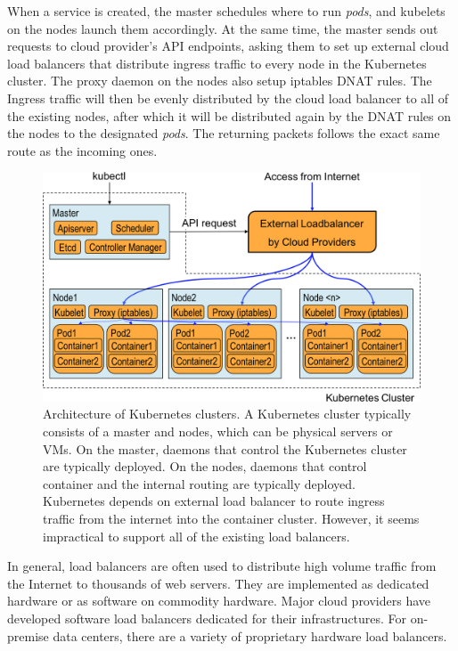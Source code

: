 When a service is created, the master schedules where to run {\em pods}, and kubelets on the nodes launch them accordingly.
At the same time, the master sends out requests to cloud provider's API endpoints, asking them to set up external cloud load balancers that distribute ingress traffic to every node in the Kubernetes cluster.
The proxy daemon on the nodes also setup iptables DNAT \cite{MartinA.Brown2017} rules. 
The Ingress traffic will then be evenly distributed by the cloud load balancer to all of the existing nodes, 
after which it will be distributed again by the DNAT rules on the nodes to the designated {\em pods}. 
The returning packets follows the exact same route as the incoming ones.

\begin{figure}[h]
  \centering
  \includegraphics[width=0.8\columnwidth]{Figs/K8sConventional}
  
  \centering
  
  \begin{minipage}{0.9\columnwidth}
    \caption[Architecture of Kubernetes clusters]{
      Architecture of Kubernetes clusters.
      A Kubernetes cluster typically consists of a master and nodes, which can be physical servers or VMs.
      On the master, daemons that control the Kubernetes cluster are typically deployed. 
      On the nodes,  daemons that control container and the internal routing are typically deployed.
      Kubernetes depends on external load balancer to route ingress traffic from the internet into the container cluster.
      However, it seems impractical to support all of the existing load balancers.
    }
    \label{fig:k8s_intro}
  \end{minipage}
  
\end{figure}

In general, load balancers are often used to distribute high volume traffic from the Internet to thousands of web servers.
They are implemented as dedicated hardware or as software on commodity hardware.
Major cloud providers have developed software load balancers \cite{eisenbud2016maglev,patel2013ananta} dedicated for their infrastructures.
For on-premise data centers, there are a variety of proprietary hardware load balancers.

